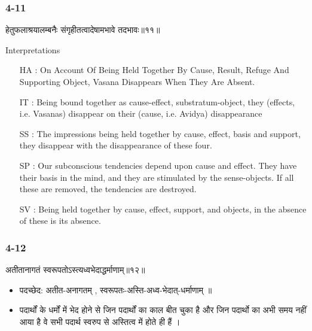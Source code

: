 \begin{frame}[fragile]\frametitle{4-11}
\begin{sanskrit}
हेतुफलाश्रयालम्बनैः संगृहीतत्वादेषामभावे तदभावः॥११॥
\end{sanskrit}

Interpretations
\begin{itemize}	
\item [HA]: On Account Of Being Held Together By Cause, Result, Refuge And Supporting Object, Vasana Disappears When They Are Absent.
\item [IT]: Being bound together as cause-effect, substratum-object, they (effects, i.e. Vasanas) disappear on their (cause, i.e. Avidya) disappearance
\item [SS]: The impressions being held together by cause, effect, basis and support, they disappear with the disappearance of these four.
\item [SP]: Our subconscious tendencies depend upon cause and effect. They have their basis in the mind, and they are stimulated by the sense-objects. If all these are removed, the tendencies are destroyed.
\item [SV]: Being held together by cause, effect, support, and objects, in the absence of these is its absence. 
\end{itemize}
\end{frame}


\begin{frame}[fragile]\frametitle{4-12}
\begin{sanskrit}
अतीतानागतं स्वरूपतोऽस्त्यध्वभेदाद्धर्माणाम्॥१२॥
\end{sanskrit}

\begin{itemize}
\item पदच्छेद:  अतीत-अनागतम् , स्वरूपतः-अस्ति-अध्व-भेदात्-धर्माणाम् ॥
\item पदार्थों के धर्मों में भेद होने से जिन पदार्थों का काल बीत चुका है और जिन पदार्थो का अभी समय नहीं आया है वे सभी पदार्थ स्वरुप से अस्तित्व में होते ही हैं ।
\end{itemize}
\end{frame}


